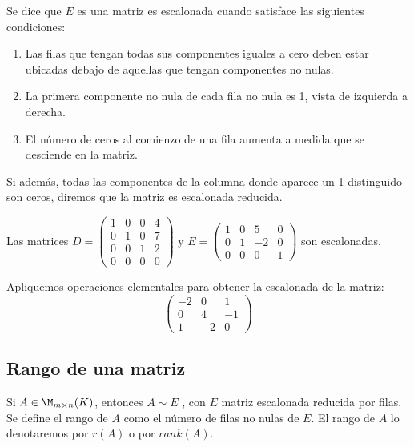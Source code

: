 \begin{defin}
Se dice que $E$ es una matriz es escalonada cuando satisface las siguientes condiciones:
\begin{enumerate}
    \item Las filas que tengan todas sus componentes iguales a cero deben estar ubicadas debajo
de aquellas que tengan componentes no nulas.
\item La primera componente no nula de cada fila no nula es 1, vista de izquierda a derecha.
\item El número de ceros al comienzo de una fila aumenta a medida que se desciende en la
matriz.

\end{enumerate}

Si adem\'as, todas las componentes de la columna donde aparece un 1 distinguido son ceros, diremos que la matriz es escalonada reducida.
\end{defin}

\begin{ejem}
Las matrices $D=\begin{pmatrix}  1 & 0 & 0& 4\\ 0 & 1 & 0& 7\\
0 & 0 & 1& 2\\
0 & 0 & 0& 0\end{pmatrix}$ y $E=\begin{pmatrix}  1 & 0 & 5& 0\\ 0 & 1 & -2& 0\\
0 & 0 & 0& 1\end{pmatrix}$ son escalonadas.
\end{ejem}

\begin{ejer}
    Apliquemos operaciones elementales para obtener la escalonada de la matriz:
    \[\begin{pmatrix}  -2 & 0 & 1\\ 0 & 4 & -1\\1 & -2 & 0\end{pmatrix}\]
\end{ejer}

\vspace*{2cm}

\subsection{Rango de una matriz}

\begin{defin}
Si $A \in \M_{m\times n}(K)$, entonces $A \sim E$ , con $E$ matriz escalonada reducida por filas. Se define el
rango de $A$ como el número de filas no nulas de $E$. El rango de $A$ lo denotaremos por $r(A)$ o por $rank(A)$.
\end{defin}

